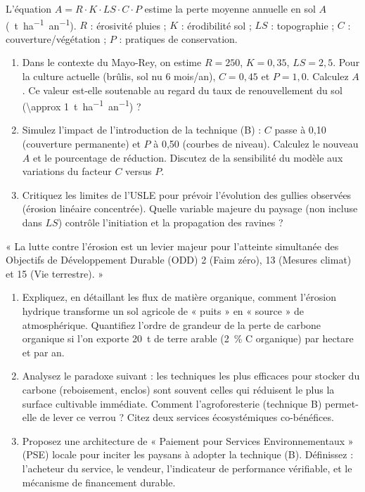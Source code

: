 \documentclass[11pt]{article}
\begin{document}
\begin{exercice}
L'équation $A = R \cdot K \cdot LS \cdot C \cdot P$ estime la perte moyenne annuelle en sol $A$ (\SI{}{t.ha^{-1}.an^{-1}}). $R$ : érosivité pluies ; $K$ : érodibilité sol ; $LS$ : topographie ; $C$ : couverture/végétation ; $P$ : pratiques de conservation.

\begin{enumerate}
    \item[2 pts] Dans le contexte du Mayo-Rey, on estime $R=250$, $K=0,35$, $LS=2,5$. Pour la culture actuelle (brûlis, sol nu 6 mois/an), $C=0,45$ et $P=1,0$. Calculez $A$. Ce valeur est-elle soutenable au regard du taux de renouvellement du sol (\SI{\approx 1}{t.ha^{-1}.an^{-1}}) ?
    \item[2 pts] Simulez l'impact de l'introduction de la technique (B) : $C$ passe à 0,10 (couverture permanente) et $P$ à 0,50 (courbes de niveau). Calculez le nouveau $A$ et le pourcentage de réduction. Discutez de la sensibilité du modèle aux variations du facteur $C$ versus $P$.
    \item[2 pts] Critiquez les limites de l'USLE pour prévoir l'évolution des gullies observées (érosion linéaire concentrée). Quelle variable majeure du paysage (non incluse dans $LS$) contrôle l'initiation et la propagation des ravines ?
\end{enumerate}
\end{exercice}

\begin{exercice}
« La lutte contre l'érosion est un levier majeur pour l'atteinte simultanée des Objectifs de Développement Durable (ODD) 2 (Faim zéro), 13 (Mesures climat) et 15 (Vie terrestre). »

\begin{enumerate}
    \item[2 pts] Expliquez, en détaillant les flux de matière organique, comment l'érosion hydrique transforme un sol agricole de « puits » en « source » de  atmosphérique. Quantifiez l'ordre de grandeur de la perte de carbone organique si l'on exporte \SI{20}{t} de terre arable (\SI{2}{\%} C organique) par hectare et par an.
    \item[2 pts] Analysez le paradoxe suivant : les techniques les plus efficaces pour stocker du carbone (reboisement, enclos) sont souvent celles qui réduisent le plus la surface cultivable immédiate. Comment l'agroforesterie (technique B) permet-elle de lever ce verrou ? Citez deux services écosystémiques co-bénéfices.
    \item[2 pts] Proposez une architecture de « Paiement pour Services Environnementaux » (PSE) locale pour inciter les paysans à adopter la technique (B). Définissez : l'acheteur du service, le vendeur, l'indicateur de performance vérifiable, et le mécanisme de financement durable.
\end{enumerate}
\end{exercice}
\end{document}
